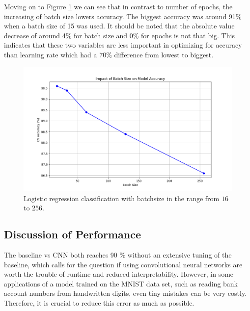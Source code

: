 Moving on to Figure \ref{fig:LogRegBatchsize} we can see that in contrast to number of epochs, the increasing of batch size lowers accuracy. The biggest accuracy was around 91\% when a batch size of 15 was used. It should be noted that the absolute value decrease of around 4\% for batch size and 0\% for epochs is not that big. This indicates that these two variables are less important in optimizing for accuracy than learning rate which had a 70\% difference from lowest to biggest. 

\begin{figure}[H]
    \centering
    \includegraphics[width=\textwidth]{results/logreg/batch_size_study.png}
    \caption{Logistic regression classification with batchsize in the range from $16$ to $256$.}
    \label{fig:LogRegBatchsize}
\end{figure}

\subsection{Discussion of Performance}
The baseline vs CNN both reaches 90 \% without an extensive tuning of the baseline, which calls for the question if using convolutional neural networks are worth the trouble of runtime and reduced interpretability. However, in some applications of a model trained on the MNIST data set, such
as reading bank account numbers from handwritten digits, even tiny mistakes can be very costly.
Therefore, it is crucial to reduce this error as much as possible. \cite{raschka2022machine}


